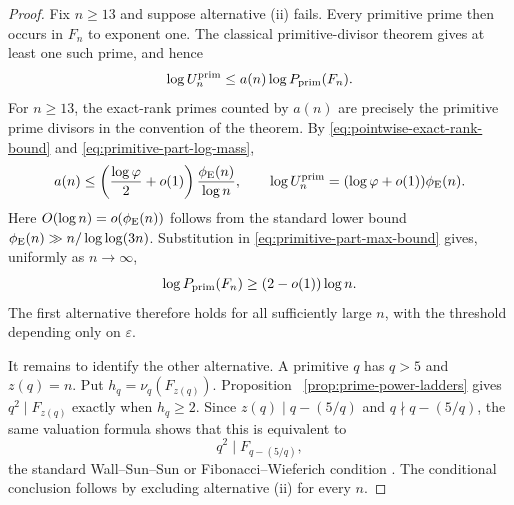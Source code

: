 \begin{proof}
Fix $n\geq13$ and suppose alternative \textup{(ii)} fails.  Every primitive
prime then occurs in $F_n$ to exponent one.  The classical primitive-divisor
theorem gives at least one such prime, and hence
\begin{equation}\label{eq:primitive-part-max-bound}
 \log U_n^{\rm prim}
 \leq a(n)\log P_{\rm prim}(F_n).
\end{equation}
For $n\geq13$, the exact-rank primes counted by $a(n)$ are precisely the
primitive prime divisors in the convention of the theorem.  By
\eqref{eq:pointwise-exact-rank-bound} and
\eqref{eq:primitive-part-log-mass},
\[
 a(n)\leq
 \left(\frac{\log\varphi}{2}+o(1)\right)
 \frac{\phi_{\rm E}(n)}{\log n},
 \qquad
 \log U_n^{\rm prim}
 =(\log\varphi+o(1))\phi_{\rm E}(n).
\]
Here $O(\log n)=o(\phi_{\rm E}(n))$ follows from the standard lower bound
$\phi_{\rm E}(n)\gg n/\log\log(3n)$.  Substitution in
\eqref{eq:primitive-part-max-bound} gives, uniformly as $n\to\infty$,
\[
 \log P_{\rm prim}(F_n)\geq(2-o(1))\log n.
\]
The first alternative therefore holds for all sufficiently large $n$, with
the threshold depending only on $\varepsilon$.

It remains to identify the other alternative.  A primitive $q$ has
$q>5$ and $z(q)=n$.  Put $h_q=\nu_q(F_{z(q)})$.  Proposition~
\ref{prop:prime-power-ladders} gives $q^2\mid F_{z(q)}$ exactly when
$h_q\geq2$.  Since $z(q)\mid q-(5/q)$ and $q\nmid q-(5/q)$, the same
valuation formula shows that this is equivalent to
\[
 q^2\mid F_{q-(5/q)},
\]
the standard Wall--Sun--Sun or Fibonacci--Wieferich condition
\cite{Klaska2018WallConjecture}.  The conditional conclusion follows by
excluding alternative \textup{(ii)} for every $n$.
\end{proof}

